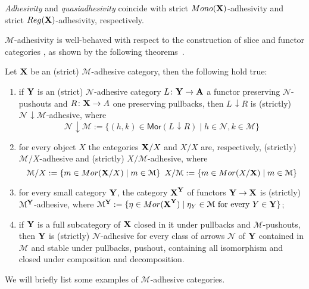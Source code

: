 \documentclass[runningheads,envcountsect]{lipics-v2021}
\def\X{\textbf {\textup{X}}}
\def\Y{\textbf {\textup{Y}}}
\def\A{\textbf {\textup{A}}}
\newcommand{\comma}[2]{#1\hspace{1pt} {\downarrow}#2}
\newcommand{\mor}{\mathsf{Mor}}
\newcommand{\mon}{\mathsf{Mono}}
\newcommand{\reg}{\mathsf{Reg}}
\begin{document}
\begin{remark}
	\label{rem:salva}
	\emph{Adhesivity} and \emph{quasiadhesivity} 
	\cite{lack2005adhesive,garner2012axioms} coincide with strict
	$\mon(\X) $-adhesivity and strict $\reg(\X)$-adhesivity,
	respectively.
\end{remark}


$\mathcal{M}$-adhesivity is well-behaved with respect to  the construction of slice and functor categories \cite{mac2013categories}, as shown by the following theorems~\cite{ehrig2006fundamentals,lack2005adhesive}.

\begin{theorem}
	\label{thm:slice-functors}
	Let $\X$ be an (strict) $\mathcal{M}$-adhesive category, then the following hold true:
	\begin{enumerate}
		\item if $\Y$ is an (strict) $\mathcal{N}$-adhesive category $L\colon \Y\to \A$ a functor preserving $\mathcal{N}$-pushouts and $R\colon \X\to A$ one preserving pullbacks, then $\comma{L}{R}$ is (strictly) $\comma{\mathcal{N}}{\mathcal{M}}$-adhesive, where
		\[\comma{\mathcal{N}}{\mathcal{M}}:=\{(h,k) \in \mor(\comma{L}{R}) \mid h\in \mathcal{N}, k\in \mathcal{M}\}\]
		\item for every object $X$
		the categories $\X/X$  and $X/X$ are, respectively, (strictly) $\mathcal{M}/X$-adhesive and (strictly) $X/\mathcal{M}$-adhesive, where
		\[\mathcal{M}/X:=\{m\in \mor(\X/X) \mid m\in
		\mathcal{M}\} \hspace{5pt} X/\mathcal{M}:=\{m\in \mor(X/\X) \mid m\in \mathcal{M}\}\]
		\item for every small category $\Y$, the category $\X^\Y$ of
		functors $\Y\to \X$ is (strictly) $\mathcal{M}^{\Y}$-adhesive, where
		$\mathcal{M}^{\Y}:=\{\eta \in \mor(\X^\Y) \mid \eta_Y \in
		\mathcal{M} \text{ for every } Y\in \Y\}$;
		\item if $\Y$ is a full subcategory of $\X$ closed in it under pullbacks and $\mathcal{M}$-pushouts, then $\Y$ is (strictly) $\mathcal{N}$-adhesive for every class of arrows $\mathcal{N}$ of $\Y$ contained in $\mathcal{M}$ and  stable under pullbacks, pushout, containing all isomorphism and closed under composition and decomposition.
	\end{enumerate} 
\end{theorem}

We will briefly list some examples of $\mathcal{M}$-adhesive categories.
\end{document}
